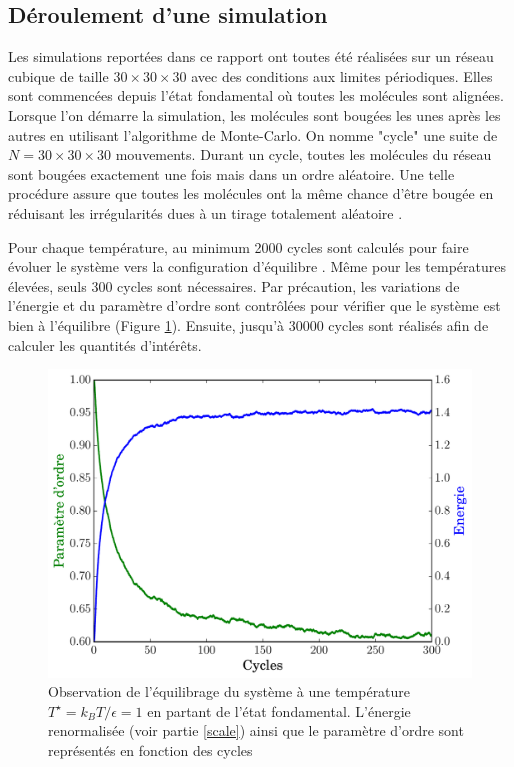 \documentclass[11pt,a4paper]{article}
\numberwithin{equation}{section}
\begin{document}
\subsection{Déroulement d'une simulation} 
Les simulations reportées dans ce rapport ont toutes été réalisées sur un réseau cubique de taille $30\times 30\times 30$ avec des conditions aux limites périodiques. Elles sont commencées depuis l'état fondamental où toutes les molécules sont alignées. Lorsque l'on démarre la simulation, les molécules sont bougées les unes après les autres en utilisant l'algorithme de Monte-Carlo. On nomme "cycle" une suite de $N = 30\times 30\times 30$ mouvements. Durant un cycle, toutes les molécules du réseau sont bougées exactement une fois mais dans un ordre aléatoire. Une telle procédure assure que toutes les molécules ont la même chance d'être bougée en réduisant les irrégularités dues à un tirage totalement aléatoire \cite{fabbri}. 
\medskip

Pour chaque température, au minimum 2000 cycles sont calculés pour faire évoluer le système vers la configuration d'équilibre . Même pour les températures élevées, seuls 300 cycles sont nécessaires. Par précaution, les variations de l'énergie et du paramètre d'ordre sont contrôlées pour vérifier que le système est bien à l'équilibre (Figure \ref{equilibrage}). Ensuite, jusqu'à 30000 cycles sont réalisés afin de calculer les quantités d'intérêts.

\begin{figure}[h!]
    \centering	    
	\includegraphics[scale=0.6]{figures/equilibrage.pdf}
    \caption{Observation de l'équilibrage du système à une température $T^\star = k_B T/\epsilon = 1$ en partant de l'état fondamental. L'énergie renormalisée (voir partie \ref{scale}) ainsi que le paramètre d'ordre sont représentés en fonction des cycles}
    	\label{equilibrage} 
\end{figure}
\end{document}
